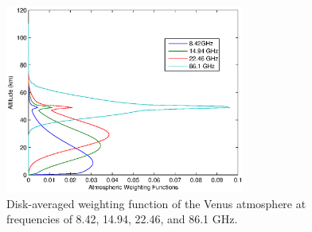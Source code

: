 \begin{figure}[p]
    \centering
	\includegraphics[width=0.7\textwidth]{./rtm/plots/weight.eps}
	\caption{Disk-averaged weighting function of the Venus atmosphere at frequencies of 8.42, 14.94, 22.46, and 86.1 GHz. }
		\label{fig:weight}
\end{figure}